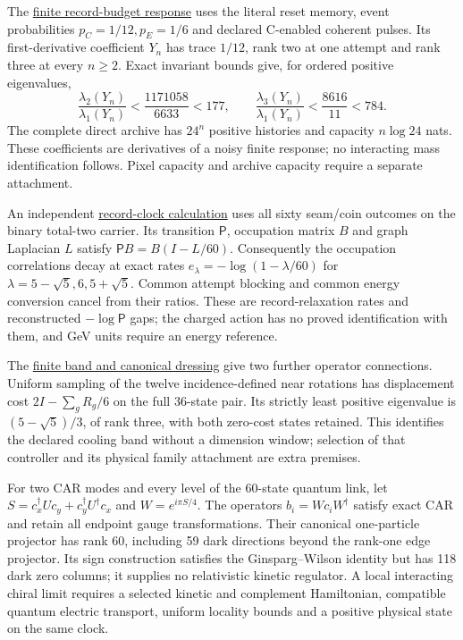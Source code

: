 The \href{https://github.com/FloatingPragma/observer-patch-holography/blob/main/model/particle_calibration_selection/PROOF_CAPACITY_RESPONSE.md}{finite record-budget response}
uses the literal reset memory, event probabilities $p_C=1/12,p_E=1/6$
and declared C-enabled coherent pulses. Its first-derivative coefficient
$Y_n$ has trace $1/12$, rank two at one attempt and rank three at every
$n\ge2$. Exact invariant bounds give, for ordered positive eigenvalues,
\[
 \frac{\lambda_2(Y_n)}{\lambda_1(Y_n)}<\frac{1171058}{6633}<177,
 \qquad
 \frac{\lambda_3(Y_n)}{\lambda_1(Y_n)}<\frac{8616}{11}<784.
\]
The complete direct archive has $24^n$ positive histories and capacity
$n\log24$ nats. These coefficients are derivatives of
a noisy finite response; no interacting mass identification follows.
Pixel capacity and archive capacity require a separate attachment.

An independent \href{https://github.com/FloatingPragma/observer-patch-holography/blob/main/model/particle_calibration_selection/PROOF_CLOCK_UNITS.md}{record-clock calculation}
uses all sixty seam/coin outcomes on the binary total-two carrier.
Its transition $\mathsf P$, occupation matrix $B$ and graph Laplacian $L$
satisfy $\mathsf PB=B(I-L/60)$. Consequently the occupation correlations
decay at exact rates $e_\lambda=-\log(1-\lambda/60)$ for
$\lambda=5-\sqrt5,6,5+\sqrt5$. Common attempt blocking and common energy
conversion cancel from their ratios. These are record-relaxation rates
and reconstructed $-\log\mathsf P$ gaps; the charged action has no proved
identification with them, and GeV units require an energy reference.

The \href{https://github.com/FloatingPragma/observer-patch-holography/blob/main/model/particle_calibration_selection/PROOF_FAMILIES_CHIRALITY.md}{finite band and canonical dressing}
give two further operator connections. Uniform sampling of the twelve
incidence-defined near rotations has displacement cost $2I-\sum_gR_g/6$
on the full 36-state pair. Its strictly least positive eigenvalue is
$(5-\sqrt5)/3$, of rank three, with both zero-cost states retained.
This identifies the declared cooling band without a dimension window;
selection of that controller and its physical family attachment are extra
premises.

For two CAR modes and every level of the 60-state quantum link, let
$S=c_x^\dagger Uc_y+c_y^\dagger U^\dagger c_x$ and
$W=e^{i\pi S/4}$. The operators $b_i=Wc_iW^\dagger$ satisfy exact CAR
and retain all endpoint gauge transformations. Their canonical
one-particle projector has rank 60, including 59 dark directions beyond the
rank-one edge projector. Its sign construction satisfies the
Ginsparg--Wilson identity but has 118 dark zero columns; it supplies no
relativistic kinetic regulator. A local interacting chiral limit requires
a selected kinetic and complement Hamiltonian, compatible quantum electric
transport, uniform locality bounds and a positive physical state on the
same clock.

